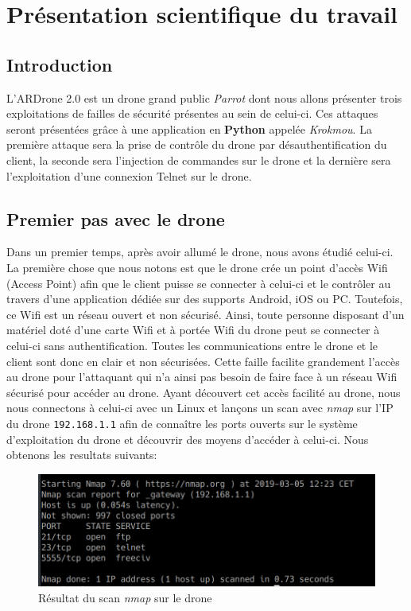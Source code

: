 \section{Présentation scientifique du travail}
\subsection{Introduction}
L'ARDrone 2.0 est un drone grand public \textit{Parrot} dont nous allons présenter trois exploitations de failles de sécurité présentes au sein de celui-ci. Ces attaques seront présentées grâce à une application en \textbf{Python} appelée \textit{Krokmou}. La première attaque sera la prise de contrôle du drone par désauthentification du client, la seconde sera l'injection de commandes sur le drone et la dernière sera l'exploitation d'une connexion Telnet sur le drone.

\subsection{Premier pas avec le drone}
Dans un premier temps, après avoir allumé le drone, nous avons étudié celui-ci. La première chose que nous notons est que le drone crée un point d'accès Wifi (Access Point) afin que le client puisse se connecter à celui-ci et le contrôler au travers d'une application dédiée sur des supports Android, iOS ou PC. Toutefois, ce Wifi est un réseau ouvert et non sécurisé. Ainsi, toute personne disposant d'un matériel doté d'une carte Wifi et à portée Wifi du drone peut se connecter à celui-ci sans authentification. Toutes les communications entre le drone et le client sont donc en clair et non sécurisées. Cette faille facilite grandement l'accès au drone pour l'attaquant qui n'a ainsi pas besoin de faire face à un réseau Wifi sécurisé pour accéder au drone. Ayant découvert cet accès facilité au drone, nous nous connectons à celui-ci avec un Linux et lançons un scan avec \textit{nmap} sur l'IP du drone \verb!192.168.1.1! afin de connaître les ports ouverts sur le système d'exploitation du drone et découvrir des moyens d'accéder à celui-ci. Nous obtenons les resultats suivants:

\begin{figure}[H]
  \centering
  \includegraphics[scale=0.5]{images/nmap.png}
  \caption{Résultat du scan \textit{nmap} sur le drone}
\end{figure}

